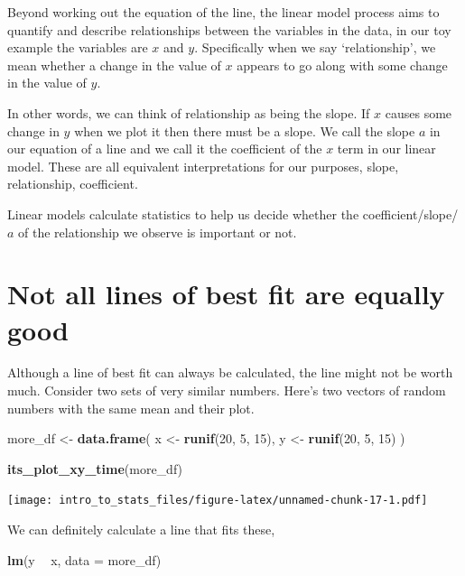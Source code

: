 \documentclass[
]{book}
\newenvironment{Shaded}{\begin{snugshade}}{\end{snugshade}}
\newcommand{\DataTypeTok}[1]{\textcolor[rgb]{0.13,0.29,0.53}{#1}}
\newcommand{\DecValTok}[1]{\textcolor[rgb]{0.00,0.00,0.81}{#1}}
\newcommand{\KeywordTok}[1]{\textcolor[rgb]{0.13,0.29,0.53}{\textbf{#1}}}
\newcommand{\NormalTok}[1]{#1}
\newcommand{\OperatorTok}[1]{\textcolor[rgb]{0.81,0.36,0.00}{\textbf{#1}}}
\newcommand{\StringTok}[1]{\textcolor[rgb]{0.31,0.60,0.02}{#1}}
\begin{document}
Beyond working out the equation of the line, the linear model process aims to quantify and describe relationships between the variables in the data, in our toy example the variables are \(x\) and \(y\). Specifically when we say `relationship', we mean whether a change in the value of \(x\) appears to go along with some change in the value of \(y\).

In other words, we can think of relationship as being the slope. If \(x\) causes some change in \(y\) when we plot it then there must be a slope. We call the slope \(a\) in our equation of a line and we call it the coefficient of the \(x\) term in our linear model. These are all equivalent interpretations for our purposes, slope, relationship, coefficient.

Linear models calculate statistics to help us decide whether the coefficient/slope/\(a\) of the relationship we observe is important or not.

\hypertarget{not-all-lines-of-best-fit-are-equally-good}{%
\section{Not all lines of best fit are equally good}\label{not-all-lines-of-best-fit-are-equally-good}}

Although a line of best fit can always be calculated, the line might not be worth much. Consider two sets of very similar numbers. Here's two vectors of random numbers with the same mean and their plot.

\begin{Shaded}
\begin{Highlighting}[]
\NormalTok{more_df <-}\StringTok{ }\KeywordTok{data.frame}\NormalTok{(}
\NormalTok{  x <-}\StringTok{ }\KeywordTok{runif}\NormalTok{(}\DecValTok{20}\NormalTok{, }\DecValTok{5}\NormalTok{, }\DecValTok{15}\NormalTok{),}
\NormalTok{  y <-}\StringTok{ }\KeywordTok{runif}\NormalTok{(}\DecValTok{20}\NormalTok{, }\DecValTok{5}\NormalTok{, }\DecValTok{15}\NormalTok{)}
\NormalTok{)}

\KeywordTok{its_plot_xy_time}\NormalTok{(more_df)}
\end{Highlighting}
\end{Shaded}

\texttt{[image: intro\_to\_stats\_files/figure-latex/unnamed-chunk-17-1.pdf]}

We can definitely calculate a line that fits these,

\begin{Shaded}
\begin{Highlighting}[]
\KeywordTok{lm}\NormalTok{(y }\OperatorTok{~}\StringTok{ }\NormalTok{x, }\DataTypeTok{data =}\NormalTok{ more_df)}
\end{Highlighting}
\end{Shaded}
\end{document}
